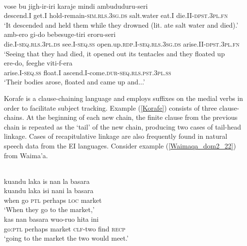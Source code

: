 \ea \label{Korafe}
\\
\ea
\gll vose bu jigh-ir-iri karaje mindi ambududuru-seri \\
descend.I get.I hold-remain-\textsc{sim}.\textsc{rls}.3\textsc{sg}.\textsc{ds} salt.water eat.I die.II-\textsc{dpst}.3\textsc{pl}.\textsc{fn} \\
\glft `It descended and held them while they drowned (lit. ate salt water and died).' \\ 
\ex
\gll amb-ero gi-do bebesuge-tiri eroru-seri \\
die.I-\textsc{seq}.\textsc{rls}.3\textsc{pl}.\textsc{ds} see.I-\textsc{seq}.\textsc{ss} open.up.\textsc{rdp}.I-\textsc{seq}.\textsc{rls}.3\textsc{sg}.\textsc{ds} arise.II-\textsc{dpst}.3\textsc{pl}.\textsc{fn} \\
\glft `Seeing that they had died, it opened out its tentacles and they floated up \\ 
\ex
\gll ere-do, feeghe viti-f-era \\ 
arise.I-\textsc{seq}.\textsc{ss} float.I ascend.I-come.\textsc{dur}-\textsc{seq}.\textsc{rls}.\textsc{pst}.3\textsc{pl}.\textsc{ss} \\
\glft `Their bodies arose, floated and came up and...' \\ 
\z
\z

Korafe is a clause-chaining language and employs suffixes on the medial verbs in order to facilitate subject tracking. Example (\ref{Korafe}) consists of three clause-chains. At the beginning of each new chain, the finite clause from the previous chain is repeated as the `tail' of the new chain, producing two cases of tail-head linkage. Cases of recapitulative linkage are also frequently found in natural speech data from the EI languages. Consider example (\ref{Waimaqa_dom2_22}) from Waima'a.

\ea \label{Waimaqa_dom2_22}
\\
\ea
\glll kuandu laka is nan la basara \\
kuandu laka isi nani la basara \\
when go \textsc{ptl} perhaps \textsc{loc} market \\
\glft `When they go to the market,' \\ 
\ex
\gll kas nan basara wuo-ruo hita ini \\ 
go:\textsc{ptl} perhaps market \textsc{clf}-two find \textsc{recp} \\
\glft `going to the market the two would meet.'\\ 
\z
\z


